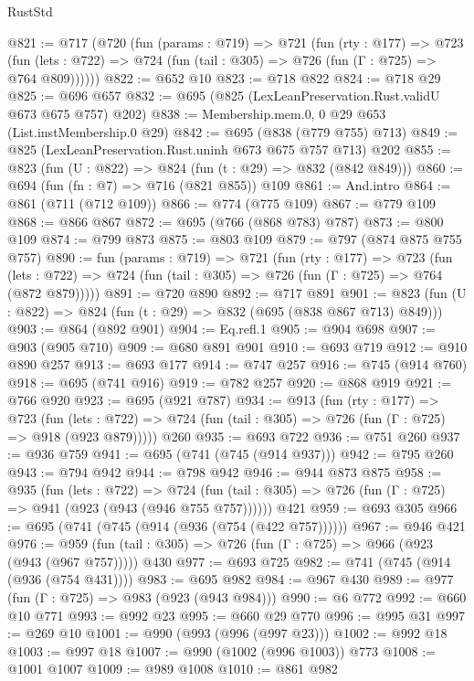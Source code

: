 \begin{lexlean}{RustStd}
\begin{coremodule}
{\begin{coremodule}
{{{{{{{{{@821 := @717
    (@720
      (fun (params : @719) =>
      @721
        (fun (rty : @177) =>
        @723
          (fun (lets : @722) => @724 (fun (tail : @305) => @726 (fun (Γ : @725) => @764 @809))))))
@822 := @652 @10
@823 := @718 @822
@824 := @718 @29
@825 := @696 @657
@832 := @695 (@825 (LexLeanPreservation.Rust.validU @673 @675 @757) @202)
@838 := Membership.mem.{0, 0} @29 @653 (List.instMembership.{0} @29)
@842 := @695 (@838 (@779 @755) @713)
@849 := @825 (LexLeanPreservation.Rust.uninh @673 @675 @757 @713) @202
@855 := @823 (fun (U : @822) => @824 (fun (t : @29) => @832 (@842 @849)))
@860 := @694 (fun (fn : @7) => @716 (@821 @855)) @109
@861 := And.intro
@864 := @861 (@711 (@712 @109))
@866 := @774 (@775 @109)
@867 := @779 @109
@868 := @866 @867
@872 := @695 (@766 (@868 @783) @787)
@873 := @800 @109
@874 := @799 @873
@875 := @803 @109
@879 := @797 (@874 @875 @755 @757)
@890 := fun (params : @719) =>
  @721
    (fun (rty : @177) =>
    @723
      (fun (lets : @722) => @724 (fun (tail : @305) => @726 (fun (Γ : @725) => @764 (@872 @879)))))
@891 := @720 @890
@892 := @717 @891
@901 := @823 (fun (U : @822) => @824 (fun (t : @29) => @832 (@695 (@838 @867 @713) @849)))
@903 := @864 (@892 @901)
@904 := Eq.refl.{1}
@905 := @904 @698
@907 := @903 (@905 @710)
@909 := @680 @891 @901
@910 := @693 @719
@912 := @910 @890 @257
@913 := @693 @177
@914 := @747 @257
@916 := @745 (@914 @760)
@918 := @695 (@741 @916)
@919 := @782 @257
@920 := @868 @919
@921 := @766 @920
@923 := @695 (@921 @787)
@934 := @913
    (fun (rty : @177) =>
    @723
      (fun (lets : @722) => @724 (fun (tail : @305) => @726 (fun (Γ : @725) => @918 (@923 @879)))))
    @260
@935 := @693 @722
@936 := @751 @260
@937 := @936 @759
@941 := @695 (@741 (@745 (@914 @937)))
@942 := @795 @260
@943 := @794 @942
@944 := @798 @942
@946 := @944 @873 @875
@958 := @935
    (fun (lets : @722) =>
    @724 (fun (tail : @305) => @726 (fun (Γ : @725) => @941 (@923 (@943 (@946 @755 @757))))))
    @421
@959 := @693 @305
@966 := @695 (@741 (@745 (@914 (@936 (@754 (@422 @757))))))
@967 := @946 @421
@976 := @959 (fun (tail : @305) => @726 (fun (Γ : @725) => @966 (@923 (@943 (@967 @757))))) @430
@977 := @693 @725
@982 := @741 (@745 (@914 (@936 (@754 @431))))
@983 := @695 @982
@984 := @967 @430
@989 := @977 (fun (Γ : @725) => @983 (@923 (@943 @984)))
@990 := @6 @772
@992 := @660 @10 @771
@993 := @992 @23
@995 := @660 @29 @770
@996 := @995 @31
@997 := @269 @10
@1001 := @990 (@993 (@996 (@997 @23)))
@1002 := @992 @18
@1003 := @997 @18
@1007 := @990 (@1002 (@996 @1003)) @773
@1008 := @1001 @1007
@1009 := @989 @1008
@1010 := @861 @982
}}}}}}}}}
\end{coremodule}}
\end{coremodule}
\end{lexlean}
